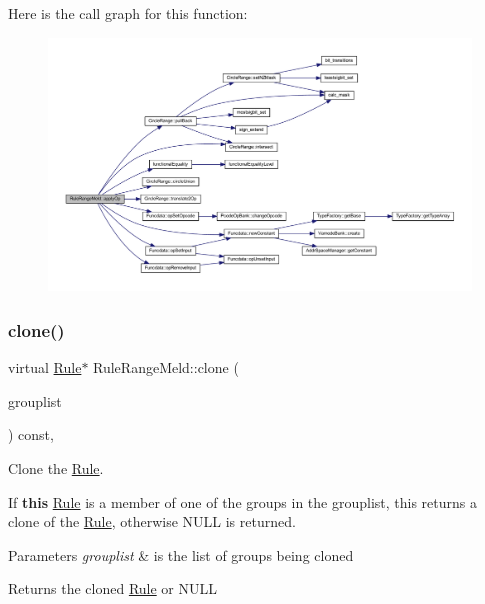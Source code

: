 Here is the call graph for this function\+:
\nopagebreak
\begin{figure}[H]
\begin{center}
\leavevmode
\includegraphics[width=350pt]{class_rule_range_meld_af99e831a0fd88d12ef57c0cd9fe01c1d_cgraph}
\end{center}
\end{figure}
\mbox{\label{class_rule_range_meld_a3d44e55b0b5ac831e649bb220ffa8342}} 
\subsubsection{\texorpdfstring{clone()}{clone()}}
{\footnotesize\ttfamily virtual \mbox{\hyperlink{class_rule}{Rule}}$\ast$ Rule\+Range\+Meld\+::clone (\begin{DoxyParamCaption}\item[{const \mbox{\hyperlink{class_action_group_list}{Action\+Group\+List}} \&}]{grouplist }\end{DoxyParamCaption}) const\hspace{0.3cm}{\ttfamily [inline]}, {\ttfamily [virtual]}}



Clone the \mbox{\hyperlink{class_rule}{Rule}}. 

If {\bfseries{this}} \mbox{\hyperlink{class_rule}{Rule}} is a member of one of the groups in the grouplist, this returns a clone of the \mbox{\hyperlink{class_rule}{Rule}}, otherwise N\+U\+LL is returned. 
\begin{DoxyParams}{Parameters}
{\em grouplist} & is the list of groups being cloned \\
\hline
\end{DoxyParams}
\begin{DoxyReturn}{Returns}
the cloned \mbox{\hyperlink{class_rule}{Rule}} or N\+U\+LL 
\end{DoxyReturn}


